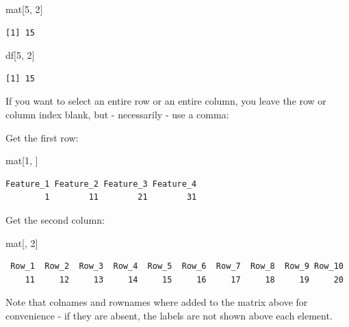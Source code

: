 \documentclass[
]{book}
\newenvironment{Shaded}{\begin{snugshade}}{\end{snugshade}}
\newcommand{\DecValTok}[1]{\textcolor[rgb]{0.00,0.00,0.81}{#1}}
\newcommand{\NormalTok}[1]{#1}
\begin{document}
\begin{Shaded}
\begin{Highlighting}[]
\NormalTok{mat[}\DecValTok{5}\NormalTok{, }\DecValTok{2}\NormalTok{]}
\end{Highlighting}
\end{Shaded}

\begin{verbatim}
[1] 15
\end{verbatim}

\begin{Shaded}
\begin{Highlighting}[]
\NormalTok{df[}\DecValTok{5}\NormalTok{, }\DecValTok{2}\NormalTok{]}
\end{Highlighting}
\end{Shaded}

\begin{verbatim}
[1] 15
\end{verbatim}

If you want to select an entire row or an entire column, you leave the row or column index blank, but - necessarily - use a comma:

Get the first row:

\begin{Shaded}
\begin{Highlighting}[]
\NormalTok{mat[}\DecValTok{1}\NormalTok{, ]}
\end{Highlighting}
\end{Shaded}

\begin{verbatim}
Feature_1 Feature_2 Feature_3 Feature_4 
        1        11        21        31 
\end{verbatim}

Get the second column:

\begin{Shaded}
\begin{Highlighting}[]
\NormalTok{mat[, }\DecValTok{2}\NormalTok{]}
\end{Highlighting}
\end{Shaded}

\begin{verbatim}
 Row_1  Row_2  Row_3  Row_4  Row_5  Row_6  Row_7  Row_8  Row_9 Row_10 
    11     12     13     14     15     16     17     18     19     20 
\end{verbatim}

Note that colnames and rownames where added to the matrix above for convenience - if they are absent, the labels are not shown above each element.
\end{document}
